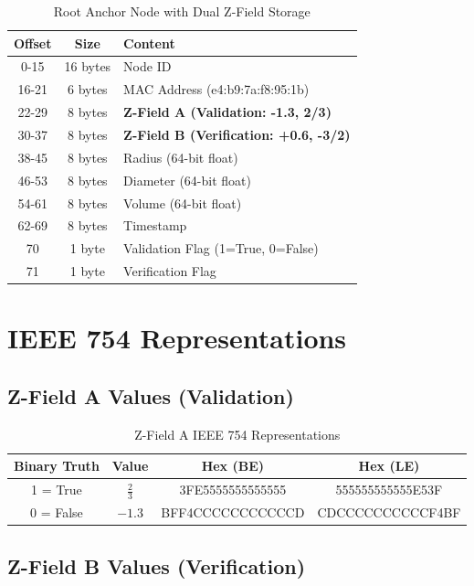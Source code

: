 \documentclass[12pt]{article}
\begin{document}
\begin{table}[h]
\centering
\begin{tabular}{|c|c|l|}
\hline
\textbf{Offset} & \textbf{Size} & \textbf{Content} \\
\hline
0-15 & 16 bytes & Node ID \\
\hline
16-21 & 6 bytes & MAC Address (e4:b9:7a:f8:95:1b) \\
\hline
22-29 & 8 bytes & \textbf{Z-Field A (Validation: -1.3, 2/3)} \\
\hline
30-37 & 8 bytes & \textbf{Z-Field B (Verification: +0.6, -3/2)} \\
\hline
38-45 & 8 bytes & Radius (64-bit float) \\
\hline
46-53 & 8 bytes & Diameter (64-bit float) \\
\hline
54-61 & 8 bytes & Volume (64-bit float) \\
\hline
62-69 & 8 bytes & Timestamp \\
\hline
70 & 1 byte & Validation Flag (1=True, 0=False) \\
\hline
71 & 1 byte & Verification Flag \\
\hline
\end{tabular}
\caption{Root Anchor Node with Dual Z-Field Storage}
\end{table}

\section{IEEE 754 Representations}

\subsection{Z-Field A Values (Validation)}

\begin{table}[h]
\centering
\begin{tabular}{|c|c|c|c|}
\hline
\textbf{Binary Truth} & \textbf{Value} & \textbf{Hex (BE)} & \textbf{Hex (LE)} \\
\hline
1 = True & $\frac{2}{3}$ & 3FE5555555555555 & 555555555555E53F \\
\hline
0 = False & $-1.3$ & BFF4CCCCCCCCCCCD & CDCCCCCCCCCCF4BF \\
\hline
\end{tabular}
\caption{Z-Field A IEEE 754 Representations}
\end{table}

\subsection{Z-Field B Values (Verification)}
\end{document}
